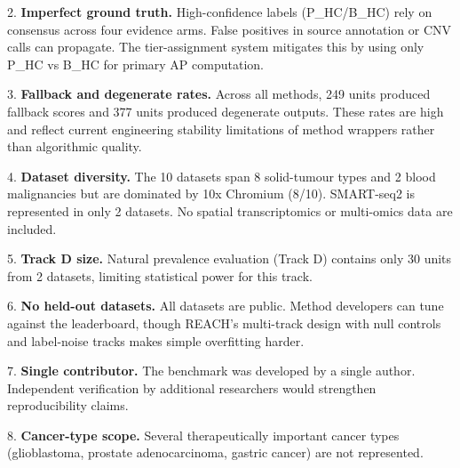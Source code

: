 \documentclass[11pt]{article}
\begin{document}
2. \textbf{Imperfect ground truth.} High-confidence labels (P\_HC/B\_HC) rely on consensus across four evidence arms. False positives in source annotation or CNV calls can propagate. The tier-assignment system mitigates this by using only P\_HC vs B\_HC for primary AP computation.

3. \textbf{Fallback and degenerate rates.} Across all methods, 249 units produced fallback scores and 377 units produced degenerate outputs. These rates are high and reflect current engineering stability limitations of method wrappers rather than algorithmic quality.

4. \textbf{Dataset diversity.} The 10 datasets span 8 solid-tumour types and 2 blood malignancies but are dominated by 10x Chromium (8/10). SMART-seq2 is represented in only 2 datasets. No spatial transcriptomics or multi-omics data are included.

5. \textbf{Track D size.} Natural prevalence evaluation (Track D) contains only 30 units from 2 datasets, limiting statistical power for this track.

6. \textbf{No held-out datasets.} All datasets are public. Method developers can tune against the leaderboard, though REACH's multi-track design with null controls and label-noise tracks makes simple overfitting harder.

7. \textbf{Single contributor.} The benchmark was developed by a single author. Independent verification by additional researchers would strengthen reproducibility claims.

8. \textbf{Cancer-type scope.} Several therapeutically important cancer types (glioblastoma, prostate adenocarcinoma, gastric cancer) are not represented.
\end{document}
